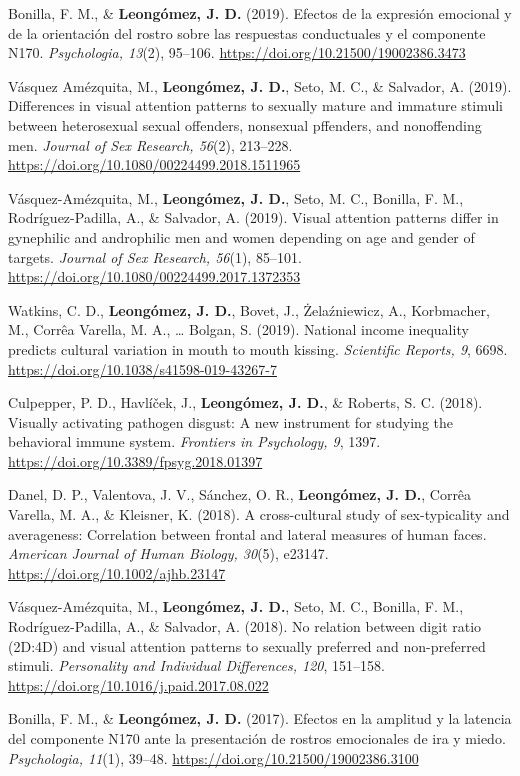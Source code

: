 \documentclass[11pt,a4paper,]{awesome-cv}
\begin{document}
Bonilla, F. M., \& \textbf{Leongómez, J. D.} (2019). Efectos de la
expresión emocional y de la orientación del rostro sobre las respuestas
conductuales y el componente N170. \emph{Psychologia, 13}(2), 95--106.
\url{https://doi.org/10.21500/19002386.3473}

Vásquez Amézquita, M., \textbf{Leongómez, J. D.}, Seto, M. C., \&
Salvador, A. (2019). Differences in visual attention patterns to
sexually mature and immature stimuli between heterosexual sexual
offenders, nonsexual pffenders, and nonoffending men. \emph{Journal of
Sex Research, 56}(2), 213--228.
\url{https://doi.org/10.1080/00224499.2018.1511965}

Vásquez-Amézquita, M., \textbf{Leongómez, J. D.}, Seto, M. C., Bonilla,
F. M., Rodríguez-Padilla, A., \& Salvador, A. (2019). Visual attention
patterns differ in gynephilic and androphilic men and women depending on
age and gender of targets. \emph{Journal of Sex Research, 56}(1),
85--101. \url{https://doi.org/10.1080/00224499.2017.1372353}

Watkins, C. D., \textbf{Leongómez, J. D.}, Bovet, J., Żelaźniewicz, A.,
Korbmacher, M., Corrêa Varella, M. A., \ldots{} Bolgan, S. (2019).
National income inequality predicts cultural variation in mouth to mouth
kissing. \emph{Scientific Reports, 9}, 6698.
\url{https://doi.org/10.1038/s41598-019-43267-7}

Culpepper, P. D., Havlíček, J., \textbf{Leongómez, J. D.}, \& Roberts,
S. C. (2018). Visually activating pathogen disgust: A new instrument for
studying the behavioral immune system. \emph{Frontiers in Psychology,
9}, 1397. \url{https://doi.org/10.3389/fpsyg.2018.01397}

Danel, D. P., Valentova, J. V., Sánchez, O. R.,
\textbf{Leongómez, J. D.}, Corrêa Varella, M. A., \& Kleisner, K.
(2018). A cross-cultural study of sex-typicality and averageness:
Correlation between frontal and lateral measures of human faces.
\emph{American Journal of Human Biology, 30}(5), e23147.
\url{https://doi.org/10.1002/ajhb.23147}

Vásquez-Amézquita, M., \textbf{Leongómez, J. D.}, Seto, M. C., Bonilla,
F. M., Rodríguez-Padilla, A., \& Salvador, A. (2018). No relation
between digit ratio (2D:4D) and visual attention patterns to sexually
preferred and non-preferred stimuli. \emph{Personality and Individual
Differences, 120}, 151--158.
\url{https://doi.org/10.1016/j.paid.2017.08.022}

Bonilla, F. M., \& \textbf{Leongómez, J. D.} (2017). Efectos en la
amplitud y la latencia del componente N170 ante la presentación de
rostros emocionales de ira y miedo. \emph{Psychologia, 11}(1), 39--48.
\url{https://doi.org/10.21500/19002386.3100}
\end{document}
